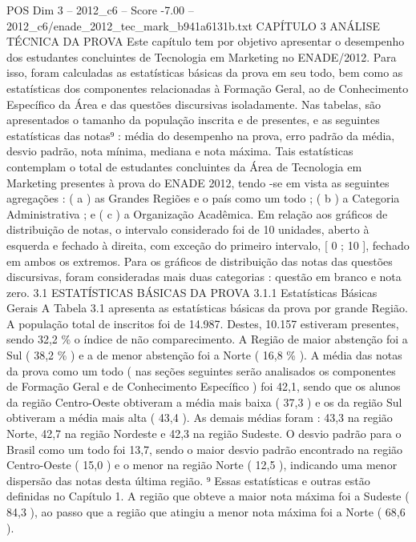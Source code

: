\begin{textsample}{POS Dim 3 – 2012\_c6 – Score -7.00 – 2012\_c6/enade\_2012\_tec\_mark\_b941a6131b.txt}  \label{ex:f3_pos_260}
CAPÍTULO 3 ANÁLISE TÉCNICA DA PROVA Este capítulo tem por objetivo apresentar o desempenho dos estudantes concluintes de Tecnologia em Marketing no ENADE/2012.
Para isso, foram calculadas as estatísticas básicas da prova em seu todo, bem como as estatísticas dos componentes relacionadas à Formação Geral, ao de Conhecimento Específico da Área e das questões discursivas isoladamente.
Nas tabelas, são apresentados o tamanho da população inscrita e de presentes, e as seguintes estatísticas das notas⁹ : média do desempenho na prova, erro padrão da média, desvio padrão, nota mínima, mediana e nota máxima.
Tais estatísticas contemplam o total de estudantes concluintes da Área de Tecnologia em Marketing presentes à prova do ENADE 2012, tendo -se em vista as seguintes agregações : ( a ) as Grandes Regiões e o país como um todo ; ( b ) a Categoria Administrativa ; e ( c ) a Organização Acadêmica.
Em relação aos gráficos de distribuição de notas, o intervalo considerado foi de 10 unidades, aberto à esquerda e fechado à direita, com exceção do primeiro intervalo, [ 0 ; 10 ], fechado em ambos os extremos.
Para os gráficos de distribuição das notas das questões discursivas, foram consideradas mais duas categorias : questão em branco e nota zero. 3.1 ESTATÍSTICAS BÁSICAS DA PROVA 3.1.1 Estatísticas Básicas Gerais A Tabela 3.1 apresenta as estatísticas básicas da prova por grande Região.
A população total de inscritos foi de 14.987.
Destes, 10.157 estiveram presentes, sendo 32,2 \% o índice de não comparecimento.
A Região de maior abstenção foi a Sul ( 38,2 \% ) e a de menor abstenção foi a Norte ( 16,8 \% ).
A média das notas da prova como um todo ( nas seções seguintes serão analisados os componentes de Formação Geral e de Conhecimento Específico ) foi 42,1, sendo que os alunos da região Centro-Oeste obtiveram a média mais baixa ( 37,3 ) e os da região Sul obtiveram a média mais alta ( 43,4 ).
As demais médias foram : 43,3 na região Norte, 42,7 na região Nordeste e 42,3 na região Sudeste.
O desvio padrão para o Brasil como um todo foi 13,7, sendo o maior desvio padrão encontrado na região Centro-Oeste ( 15,0 ) e o menor na região Norte ( 12,5 ), indicando uma menor dispersão das notas desta última região. ⁹ Essas estatísticas e outras estão definidas no Capítulo 1.
A região que obteve a maior nota máxima foi a Sudeste ( 84,3 ), ao passo que a região que atingiu a menor nota máxima foi a Norte ( 68,6 ).

\end{textsample}
